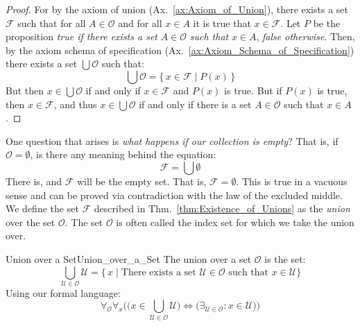         \begin{proof}
            For by the axiom of union (Ax.~\ref{ax:Axiom_of_Union}), there
            exists a set $\mathcal{F}$ such that for all $A\in\mathcal{O}$
            and for all $x\in{A}$ it is true that $x\in\mathcal{F}$. Let
            $P$ be the proposition \textit{true if there exists a set}
            $A\in\mathcal{O}$ \textit{such that} $x\in{A}$,
            \textit{false otherwise}. Then, by the axiom schema of specification
            (Ax.~\ref{ax:Axiom_Schema_of_Specification}) there exists a set
            $\bigcup\mathcal{O}$ such that:
            \begin{equation}
                \bigcup\mathcal{O}=\big\{\,x\in\mathcal{F}\;|\;P(x)\,\big\}
            \end{equation}
            But then $x\in\bigcup\mathcal{O}$ if and only if $x\in\mathcal{F}$
            and $P(x)$ is true. But if $P(x)$ is true, then $x\in\mathcal{F}$,
            and thus $x\in\bigcup\mathcal{O}$ if and only if there is a set
            $A\in\mathcal{O}$ such that $x\in{A}$.
        \end{proof}
        One question that arises is
        \textit{what happens if our collection is empty}? That is, if
        $\mathcal{O}=\emptyset$, is there any meaning behind the equation:
        \begin{equation}
            \mathcal{F}=\bigcup\emptyset
        \end{equation}
        There is, and $\mathcal{F}$ will be the empty set. That is,
        $\mathcal{F}=\emptyset$. This is true in a vacuous sense and can be
        proved via contradiction with the law of the excluded middle.
        We define the set $\mathcal{F}$ described in
        Thm.~\ref{thm:Existence_of_Unions} as the
        \textit{union}
        over the set $\mathcal{O}$. The set $\mathcal{O}$ is often called the
        index set for which we take the union over.
        \begin{fdefinition}{Union over a Set}{Union_over_a_Set}
            The \gls{union over a set} $\mathcal{O}$ is the set:
            \begin{equation*}
                \bigcup_{\mathcal{U}\in\mathcal{O}}\mathcal{U}
                =\big\{\,x\;|\;\textrm{There exists a set }
                         \mathcal{U}\in\mathcal{O}\textrm{ such that }
                         x\in\mathcal{U}\big\}
            \end{equation*}
            Using our formal language:
            \begin{equation*}
                \forall_{\mathcal{O}}\forall_{x}\bigg(
                    \Big(x\in\bigcup_{\mathcal{U}\in\mathcal{O}}\mathcal{U}\Big)
                    \Longleftrightarrow\big(\exists_{\mathcal{U}\in\mathcal{O}}:
                    x\in\mathcal{U}\big)\bigg)
            \end{equation*}
        \end{fdefinition}
